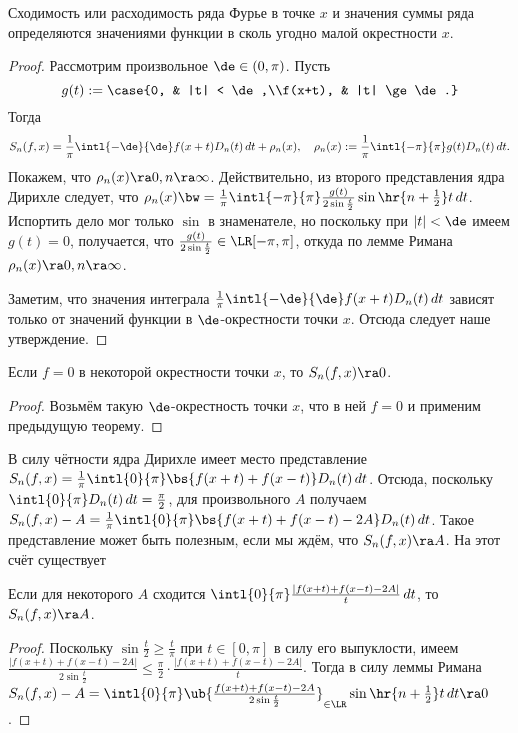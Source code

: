 \documentclass[a4paper]{article}
\newcommand{\intlop}{\intl{0}{\pi}}
\newcommand{\intlpp}{\intl{-\pi}{\pi}}
\newcommand{\frpi}{\frac{1}{\pi}}
\begin{document}
\begin{theorem}
Сходимость или расходимость ряда Фурье в точке $x$ и значения суммы ряда определяются значениями функции
в сколь угодно малой окрестности $x$.
\end{theorem}
\begin{proof}
Рассмотрим произвольное $\de \in (0,\pi)$. Пусть $$g(t) := \case{0, & |t| < \de,\\f(x+t), & |t| \ge
\de.}$$ Тогда $$S_n(f,x) = \frpi \intl{-\de}{\de} f(x+t)D_n(t)\,d t + \rho_n(x), \quad \rho_n(x) :=
\frpi \intlpp g(t)D_n(t)\,dt.$$
Покажем, что $\rho_n(x) \ra 0, n \ra \infty$. Действительно, из
второго представления ядра Дирихле следует, что $\rho_n(x) \bw= \frpi \intlpp \frac{g(t)}{2\sin
\frac{t}{2}}\sin\hr{n+\frac{1}{2}}t \,d t$. Испортить дело мог только $\sin$ в знаменателе, но
поскольку при $|t| < \de$ имеем $g(t) = 0$, получается, что $\frac{g(t)}{2\sin \frac{t}{2}}
\in\LR[-\pi,\pi]$, откуда по лемме Римана $\rho_n(x) \ra 0, n \ra \infty$.

Заметим, что значения интеграла $\frpi \intl{-\de}{\de} f(x+t)D_n(t)\,d t$ зависят только от
значений функции в $\de$-окрестности точки $x$. Отсюда следует наше утверждение.
\end{proof}

\begin{imp}
Если $f = 0$ в некоторой окрестности точки $x$, то $S_n(f,x) \ra 0$.
\end{imp}
\begin{proof}
Возьмём такую $\de$-окрестность точки $x$, что в ней $f = 0$ и применим предыдущую теорему.
\end{proof}

В силу чётности ядра Дирихле имеет место представление $S_n(f,x) = \frpi \intlop\bs{f(x+t) +
f(x-t)}D_n(t)\,d t$. Отсюда, поскольку $\intlop D_n(t)\,d t = \frac{\pi}{2}$, для произвольного
$A$ получаем $S_n(f,x) - A = \frpi \intlop\bs{f(x+t)+f(x-t)-2A}D_n(t)\,d t$. Такое представление
может быть полезным, если мы ждём, что $S_n(f,x) \ra A$. На этот счёт существует

\begin{theorem}
Если для некоторого $A$ сходится $\intlop \frac{|f(x+t)+f(x-t)-2A|}{t}\,d t$, то $S_n(f,x) \ra A$.
\end{theorem}
\begin{proof}
Поскольку $\sin\frac{t}{2} \ge \frac{t}{\pi}$ при $t \in [0,\pi]$ в силу его выпуклости, имеем
$\frac{|f(x+t)+f(x-t)-2A|}{2\sin\frac{t}{2}} \le \frac{\pi}{2}\cdot\frac{|f(x+t)+f(x-t)-2A|}{t}$.
Тогда в силу леммы Римана $S_n(f,x) - A = \intlop
\ub{\frac{f(x+t)+f(x-t)-2A}{2\sin\frac{t}{2}}}_{\in\LR} \sin\hr{n+\frac{1}{2}}t\,d t \ra 0$.
\end{proof}
\end{document}
